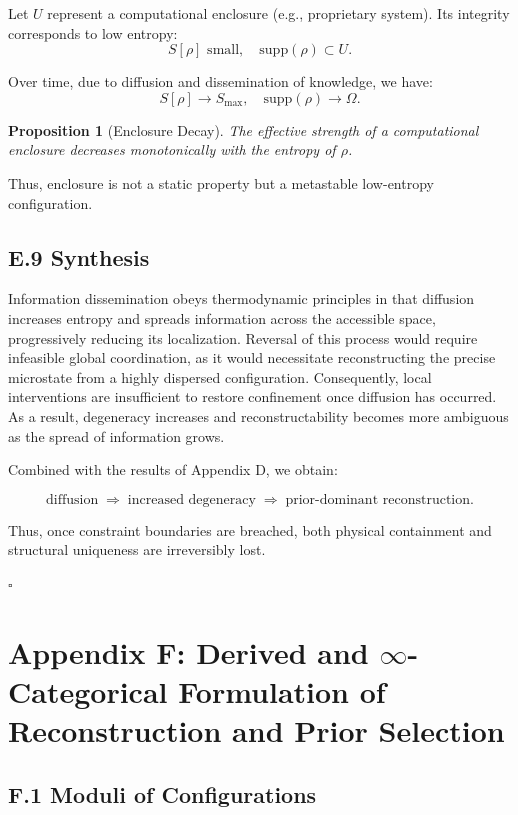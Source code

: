 \documentclass[12pt, oneside]{article}
\theoremstyle{plain}
\newtheorem{proposition}[theorem]{Proposition}
\theoremstyle{definition}
\theoremstyle{remark}
\begin{document}
Let $U$ represent a computational enclosure (e.g., proprietary system). Its integrity corresponds to low entropy:
\[
S[\rho] \text{ small}, \quad \text{supp}(\rho) \subset U.
\]

Over time, due to diffusion and dissemination of knowledge, we have:
\[
S[\rho] \to S_{\max}, \quad \text{supp}(\rho) \to \Omega.
\]

\begin{proposition}[Enclosure Decay]
The effective strength of a computational enclosure decreases monotonically with the entropy of $\rho$.
\end{proposition}

Thus, enclosure is not a static property but a metastable low-entropy configuration.

\subsection{E.9 Synthesis}

Information dissemination obeys thermodynamic principles in that diffusion increases entropy and spreads information across the accessible space, progressively reducing its localization. Reversal of this process would require infeasible global coordination, as it would necessitate reconstructing the precise microstate from a highly dispersed configuration. Consequently, local interventions are insufficient to restore confinement once diffusion has occurred. As a result, degeneracy increases and reconstructability becomes more ambiguous as the spread of information grows.

Combined with the results of Appendix D, we obtain:

\[
\text{diffusion} \;\Rightarrow\; \text{increased degeneracy} \;\Rightarrow\; \text{prior-dominant reconstruction}.
\]

Thus, once constraint boundaries are breached, both physical containment and structural uniqueness are irreversibly lost.

\hfill $\square$

\section{Appendix F: Derived and $\infty$-Categorical Formulation of Reconstruction and Prior Selection}

\subsection{F.1 Moduli of Configurations}
\end{document}
